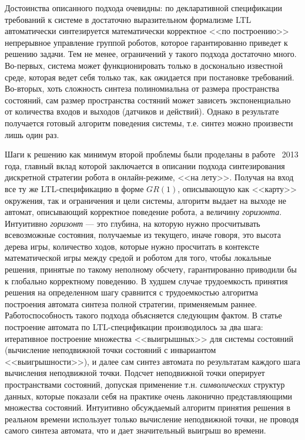 \documentclass[conference]{IEEEtran}
\begin{document}
Достоинства описанного подхода очевидны: по декларативной спецификации требований 
к системе в достаточно выразительном формализме LTL автоматически синтезируется 
математически корректное <<по построению>> непрерывное управление группой роботов, 
которое гарантированно приведет к решению задачи. Тем не менее, ограничений у 
такого подхода достаточно много. Во-первых, система может функционировать только 
в досконально известной среде, которая ведет себя только так, как ожидается при 
постановке требований. Во-вторых, хоть сложность синтеза полиномиальна от размера 
пространства состояний, сам размер пространства состяний может зависеть экспоненциально
от количества входов и выходов (датчиков и действий). Однако в результате получается 
готовый алгоритм поведения системы, т.е. синтез можно произвести лишь один раз.

Шаги к решению как минимум второй проблемы были проделаны в работе~\cite{livingston2013just} 
2013 года, главный вклад которой заключается в описании подхода синтезирования 
дискретной стратегии робота в онлайн-режиме, <<на лету>>. Получая на вход все 
ту же LTL-спецификацию в форме $GR(1)$, описывающую как <<карту>> окружения, 
так и ограничения и цели системы, алгоритм выдает на выходе не автомат, 
описывающий корректное поведение робота, а величину \textit{горизонта}. Интуитивно 
\textit{горизонт} --- это глубина, на которую нужно просчитывать всевозможные состояния, 
получаемые из текущего, иначе говоря, это высота дерева игры, количество ходов, 
которые нужно просчитать в контексте математической игры между средой и роботом 
для того, чтобы локальные решения, принятые по такому неполному обсчету, 
гарантированно приводили бы к глобально корректному поведению. В худшем случае 
трудоемкость принятия решения на определенном шагу сравнится с трудоемкостью 
алгоритма построения автомата синтеза полной стратегии, применяемым раннее. 
Работоспособность такого подхода объясняется следующим фактом. В статье~\cite{piterman2006synthesis}
построение автомата по LTL-спецификации производилось за два шага: итеративное 
построение множества <<выигрышных>> для системы состояний (вычисление 
неподвижной точки состояний с инвариантом <<выигрышности>>), и далее сам синтез 
автомата по результатам каждого шага вычисления неподвижной точки. Подсчет неподвижной
точки оперирует пространствами состояний, допуская применение т.н. 
\textit{символических} структур данных, которые показали себя на практике 
очень лаконично представляющими множества состояний. Интуитивно обсуждаемый 
алгоритм принятия решения в реальном времени использует только вычисление 
неподвижной точки, не проводя самого синтеза автомата, что и дает значительный выигрыш 
во времени.
\end{document}
